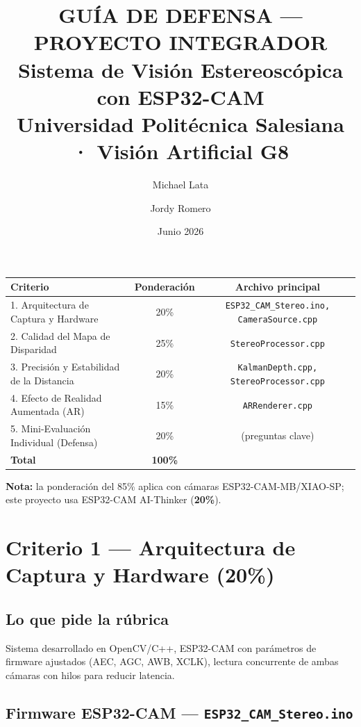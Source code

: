 \documentclass[11pt,a4paper]{article}
\title{
  {\Large\bfseries GUÍA DE DEFENSA — PROYECTO INTEGRADOR}\\[4pt]
  {\large Sistema de Visión Estereoscópica con ESP32-CAM}\\[4pt]
  {\normalsize Universidad Politécnica Salesiana · Visión Artificial G8}
}
\author{Michael Lata \and Jordy Romero}
\date{Junio 2026}
\begin{document}
\maketitle
\thispagestyle{fancy}

\begin{center}
\begin{tabular}{lcc}
\toprule
\textbf{Criterio} & \textbf{Ponderación} & \textbf{Archivo principal} \\
\midrule
1. Arquitectura de Captura y Hardware & 20\% & \texttt{ESP32\_CAM\_Stereo.ino, CameraSource.cpp} \\
2. Calidad del Mapa de Disparidad     & 25\% & \texttt{StereoProcessor.cpp} \\
3. Precisión y Estabilidad de la Distancia & 20\% & \texttt{KalmanDepth.cpp, StereoProcessor.cpp} \\
4. Efecto de Realidad Aumentada (AR) & 15\% & \texttt{ARRenderer.cpp} \\
5. Mini-Evaluación Individual (Defensa) & 20\% & (preguntas clave) \\
\midrule
\textbf{Total} & \textbf{100\%} & \\
\bottomrule
\end{tabular}
\end{center}

\vspace{6pt}
\noindent\textbf{Nota:} la ponderación del 85\% aplica con cámaras ESP32-CAM-MB/XIAO-SP; este proyecto usa ESP32-CAM AI-Thinker (\textbf{20\%}).

\section{Criterio 1 — Arquitectura de Captura y Hardware (20\%)}

\subsection*{Lo que pide la rúbrica}
Sistema desarrollado en OpenCV/C++, ESP32-CAM con parámetros de firmware ajustados
(AEC, AGC, AWB, XCLK), lectura concurrente de ambas cámaras con hilos para reducir latencia.

\subsection*{Firmware ESP32-CAM — \texttt{ESP32\_CAM\_Stereo.ino}}
\end{document}
